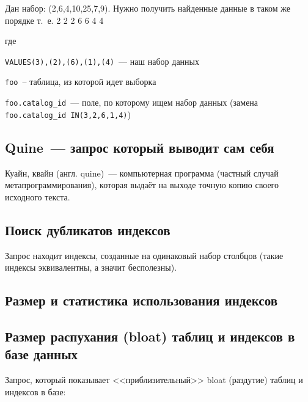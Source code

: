Дан набор: (2,6,4,10,25,7,9). Нужно получить найденные данные в таком же порядке т.~е. 2 2 2 6 6 4 4



где

\lstinline!VALUES(3),(2),(6),(1),(4)!~--- наш набор данных

\lstinline!foo!~-- таблица, из которой идет выборка

\lstinline!foo.catalog_id!~--- поле, по которому ищем набор данных (замена \lstinline!foo.catalog_id IN(3,2,6,1,4)!)



\subsection{Quine~--- запрос который выводит сам себя}

Куайн, квайн (англ. quine)~--- компьютерная программа (частный случай метапрограммирования), которая выдаёт на выходе точную копию своего исходного текста.





\subsection{Поиск дубликатов индексов}

Запрос находит индексы, созданные на одинаковый набор столбцов (такие индексы эквивалентны, а значит бесполезны).





\subsection{Размер и статистика использования индексов}





\subsection{Размер распухания (bloat) таблиц и индексов в базе данных}
\label{sec:snippets-bloating}

Запрос, который показывает <<приблизительный>> bloat (раздутие) таблиц и индексов в базе:


